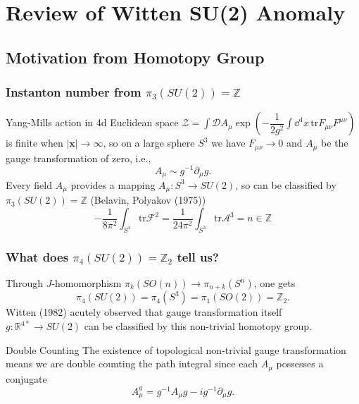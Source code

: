\documentclass[10pt,aspectratio=43,xcolor=x11names]{beamer}%
\begin{document}
\iffalse
\section{Review of Witten SU(2) Anomaly}
	\subsection{Motivation from Homotopy Group}
	\begin{frame}
		\frametitle{Instanton number from $\pi_3(SU(2))=\mathbb{Z}$}
			Yang-Mills action in 4d Euclidean space $\displaystyle\mathcal{Z}=\int\mathcal{D}A_\mu\exp \left(-\dfrac{1}{2g^2}\int\dd^4x\,\mathrm{tr}F_{\mu\nu}F^{\mu\nu}\right)$ is finite when $|\bm{x}|\rightarrow \infty$, so on a large sphere $S^3$ we have $F_{\mu\nu}\rightarrow0$ and $A_\mu$ be the gauge transformation of zero, i.e.,
			\begin{equation*}
				A_\mu\sim g^{-1}\partial_\mu g.
			\end{equation*}
			\pause
			{\color{blue}Every field $A_\mu$ provides a mapping $A_\mu:S^3\rightarrow SU(2)$, so can be classified by $\pi_3(SU(2))=\mathbb{Z}$} (Belavin, Polyakov  (1975))
			\begin{equation*}
				-\dfrac{1}{8\pi^2}\int_{S^4}\mathrm{tr}\mathcal{F}^2=\dfrac{1}{24\pi^2}\int_{S^3}\mathrm{tr}\mathcal{A}^3=n\in\mathbb{Z}
			\end{equation*}
	\end{frame}
	\begin{frame}
		\frametitle{What does $\pi_4(SU(2))=\mathbb{Z}_2$ tell us?}
		Through $J$-homomorphism $\pi_k(SO(n))\rightarrow\pi_{n+k}(S^n)$, one gets
		\begin{equation*}
			\pi_4(SU(2))=\pi_4(S^3)=\pi_1(SO(2))=\mathbb{Z}_2.
		\end{equation*}
		Witten (1982) acutely observed that gauge transformation itself $g:\mathbb{R}^{4*}\rightarrow SU(2)$ can be classified by this non-trivial homotopy group.\pause
		\begin{block}{Double Counting}
			The existence of topological non-trivial gauge transformation means we are {\color{red}double counting} the path integral since each $A_\mu$ possesses a conjugate
			\begin{equation*}
				A_\mu^g=g^{-1}A_\mu g-ig^{-1}\partial_\mu g.
			\end{equation*}
		\end{block}
	\end{frame}
\end{document}
